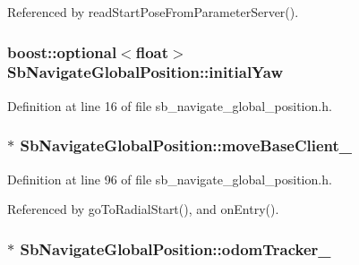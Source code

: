 Referenced by read\+Start\+Pose\+From\+Parameter\+Server().

\subsubsection[{\texorpdfstring{initial\+Yaw}{initialYaw}}]{\setlength{\rightskip}{0pt plus 5cm}boost\+::optional$<$float$>$ Sb\+Navigate\+Global\+Position\+::initial\+Yaw}\hypertarget{classSbNavigateGlobalPosition_a3c2a5e765e4a7f4bfe19c458ab469515}{}\label{classSbNavigateGlobalPosition_a3c2a5e765e4a7f4bfe19c458ab469515}


Definition at line 16 of file sb\+\_\+navigate\+\_\+global\+\_\+position.\+h.

\subsubsection[{\texorpdfstring{move\+Base\+Client\+\_\+}{moveBaseClient_}}]{$\ast$ Sb\+Navigate\+Global\+Position\+::move\+Base\+Client\+\_\+\hspace{0.3cm}{\ttfamily [private]}}\hypertarget{classSbNavigateGlobalPosition_ad98d35df0281643268e2b00450b00af5}{}\label{classSbNavigateGlobalPosition_ad98d35df0281643268e2b00450b00af5}


Definition at line 96 of file sb\+\_\+navigate\+\_\+global\+\_\+position.\+h.



Referenced by go\+To\+Radial\+Start(), and on\+Entry().

\subsubsection[{\texorpdfstring{odom\+Tracker\+\_\+}{odomTracker_}}]{$\ast$ Sb\+Navigate\+Global\+Position\+::odom\+Tracker\+\_\+\hspace{0.3cm}{\ttfamily [private]}}\hypertarget{classSbNavigateGlobalPosition_af7f17a2dabc667afa3a31c1205427ca6}{}\label{classSbNavigateGlobalPosition_af7f17a2dabc667afa3a31c1205427ca6}


